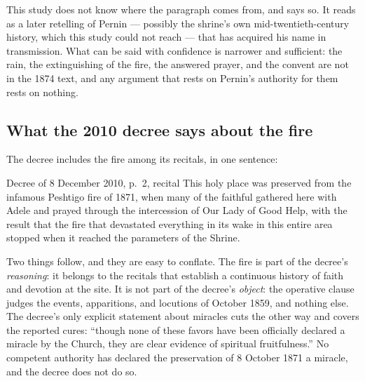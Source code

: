 This study does not know where the paragraph comes from, and says so.
It reads as a later retelling of Pernin --- possibly the shrine's own
mid-twentieth-century history, which this study could not reach ---
that has acquired his name in transmission. What can be said with
confidence is narrower and sufficient: the rain, the extinguishing of
the fire, the answered prayer, and the convent are not in the 1874
text, and any argument that rests on Pernin's authority for them rests
on nothing.

\subsection{What the 2010 decree says about the fire}

The decree includes the fire among its recitals, in one sentence:

\begin{witnesstext}{Decree of 8 December 2010, p.~2, recital}
This holy place was preserved from the infamous Peshtigo fire of 1871,
when many of the faithful gathered here with Adele and prayed through
the intercession of Our Lady of Good Help, with the result that the
fire that devastated everything in its wake in this entire area stopped
when it reached the parameters of the Shrine.
\end{witnesstext}

Two things follow, and they are easy to conflate. The fire is part of
the decree's \emph{reasoning}: it belongs to the recitals that
establish a continuous history of faith and devotion at the site. It is
not part of the decree's \emph{object}: the operative clause judges the
events, apparitions, and locutions of October 1859, and nothing else.
The decree's only explicit statement about miracles cuts the other way
and covers the reported cures: ``though none of these favors have been
officially declared a miracle by the Church, they are clear evidence of
spiritual fruitfulness.''
No competent authority has declared the preservation of 8 October 1871
a miracle, and the decree does not do so.


